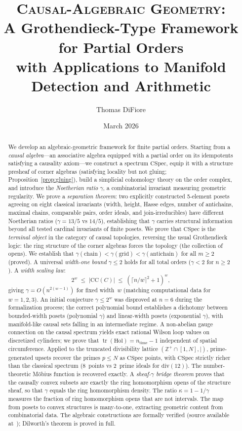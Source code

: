 \documentclass[11pt,a4paper]{article}
\title{\textsc{Causal-Algebraic Geometry}:\\[6pt]
A Grothendieck-Type Framework for Partial Orders\\[4pt]
{\large with Applications to Manifold Detection and Arithmetic}}
\author{Thomas DiFiore}
\date{March 2026}
\theoremstyle{plain}
\theoremstyle{definition}
\theoremstyle{remark}
\newcommand{\CSpec}{\mathrm{CSpec}}
\newcommand{\CC}{\mathrm{CC}}
\newcommand{\Hol}{\mathrm{Hol}}
\newcommand{\Z}{\mathbb{Z}}
\begin{document}
\maketitle

\begin{abstract}
We develop an algebraic-geometric framework for finite partial orders.
Starting from a \emph{causal algebra}---an associative algebra equipped with a partial order on its idempotents satisfying a causality axiom---we construct a spectrum $\CSpec$, equip it with a structure presheaf of corner algebras (satisfying locality but not gluing; Proposition~\ref{prop:gluing}), build a simplicial cohomology theory on the order complex, and introduce the \emph{Noetherian ratio} $\gamma$, a combinatorial invariant measuring geometric regularity.
We prove a \emph{separation theorem}: two explicitly constructed 5-element posets agreeing on eight classical invariants (width, height, Hasse edges, number of antichains, maximal chains, comparable pairs, order ideals, and join-irreducibles) have different Noetherian ratios ($\gamma = 13/5$ vs $14/5$), establishing that $\gamma$ carries structural information beyond all tested cardinal invariants of finite posets.
We prove that $\CSpec$ is the \emph{terminal object} in the category of causal topologies, reversing the usual Grothendieck logic: the ring structure of the corner algebras forces the topology (the collection of opens).
We establish that $\gamma(\text{chain}) < \gamma(\text{grid}) < \gamma(\text{antichain})$ for all $m \geq 2$ (proved). A universal \emph{width-one bound} $\gamma \leq 2$ holds for all total orders ($\gamma < 2$ for $n \geq 2$). A \emph{width scaling law}:
\[
2^w \;\leq\; |\CC(C)| \;\leq\; (\lceil n/w \rceil^2 + 1)^w,
\]
giving $\gamma = O(n^{2(w-1)})$ for fixed width~$w$ (matching computational data for $w = 1, 2, 3$).
An initial conjecture $\gamma \leq 2^w$ was disproved at $n = 6$ during the formalization process; the correct polynomial bound establishes a dichotomy between bounded-width posets (polynomial $\gamma$) and linear-width posets (exponential $\gamma$), with manifold-like causal sets falling in an intermediate regime.
A non-abelian gauge connection on the causal spectrum yields exact rational Wilson loop values on discretized cylinders; we prove that $\operatorname{tr}(\Hol) = n_{\mathrm{time}} - 1$ independent of spatial circumference.
Applied to the truncated divisibility lattice $(\Z^+ \cap [1,N], \mid)$, prime-generated upsets recover the primes $p \leq N$ as $\CSpec$ points, with $\CSpec$ strictly richer than the classical spectrum (8~points vs 2~prime ideals for $\mathrm{div}(12)$). The number-theoretic M\"obius function is recovered exactly.
A \emph{sheaf-$\gamma$ bridge theorem} proves that the causally convex subsets are exactly the ring homomorphism opens of the structure sheaf, so that $\gamma$ equals the ring homomorphism density.
The ratio $\kappa = 1 - 1/\gamma$ measures the fraction of ring homomorphism opens that are not intervals.
The map from posets to convex structures is many-to-one, extracting geometric content from combinatorial data.
The algebraic constructions are formally verified (source available at~\cite{leanrepo}); Dilworth's theorem is proved in full.
\end{abstract}
\end{document}
